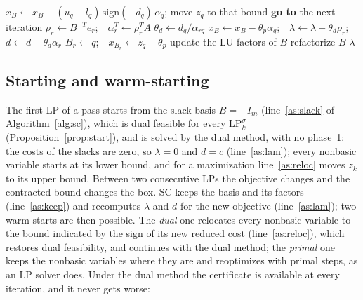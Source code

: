 \documentclass[11pt]{article}
\newcommand{\Abar}{\bar{A}}
\theoremstyle{definition}
\theoremstyle{remark}
\begin{document}
\begin{algorithm}[!tp]
\begin{algorithmic}[1]
      \State $x_B\gets x_B-(u_q-l_q)\,\mathrm{sign}(-d_q)\,\alpha_q$; move $z_q$ to that bound
      \State \textbf{go to} the next iteration 
    \EndIf
    \State $\rho_r\gets B^{-T}e_r$;\ \ $\alpha_r^T\gets\rho_r^T\Abar$\label{as:primalr}
  \EndIf
  \State $\theta_d\gets d_q/\alpha_{rq}$
  \State $x_B\gets x_B-\theta_p\alpha_q$;\ \ $\lambda\gets\lambda+\theta_d\rho_r$;\ \
    $d\gets d-\theta_d\alpha_r$\label{as:upd}
  \State $B_r\gets q$;\ \ $x_{B_r}\gets z_q+\theta_p$
  \State update the LU factors of $B$ 
   refactorize $B$\label{as:pivot} \EndIf
\EndFor
\State \Return $\lambda$ \label{as:limit}
\end{algorithmic}
\end{algorithm}

\subsection{Starting and warm-starting}\label{sec:warm}

The first LP of a pass starts from the slack basis $B=-I_m$
(line~\ref{as:slack} of Algorithm~\ref{alg:sc}), which is dual feasible for
every $\mathrm{LP}_k^{\sigma}$ (Proposition~\ref{prop:start}), and is solved by the
dual method, with no phase~1: the costs of the slacks are zero, so $\lambda=0$
and $d=c$ (line~\ref{as:lam}); every nonbasic variable starts at its lower
bound, and for a maximization line~\ref{as:reloc} moves $z_k$ to its upper
bound. Between two consecutive LPs the objective
changes and the contracted bound changes the box. SC keeps the basis and its
factors (line~\ref{as:keep}) and recomputes $\lambda$ and $d$ for the new
objective (line~\ref{as:lam}); two warm starts are then possible. The
\emph{dual} one relocates every nonbasic variable to the bound indicated by the
sign of its new reduced cost (line~\ref{as:reloc}), which restores dual
feasibility, and continues with the dual method; the \emph{primal} one keeps
the nonbasic variables where they are and reoptimizes with primal steps, as an
LP solver does. Under the dual method the
certificate is available at every iteration, and it never gets worse:
\end{document}
